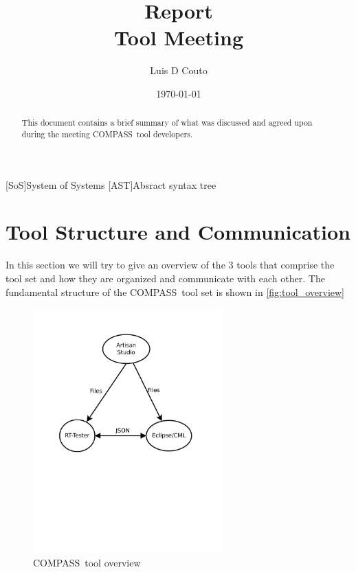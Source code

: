 \documentclass[a4paper,12pt,english]{article}
\title{Report \\ Tool Meeting}
\date{\today}
\author{Luis D Couto}
\def\compass{COMPASS}
\begin{document}
[SoS]{System of Systems}
[AST]{Absract syntax tree}

\maketitle
\listoffixmes

\begin{abstract}
This document contains a brief summary of what was discussed and agreed upon during the meeting \compass\ tool developers.

\end{abstract}






\section{Tool Structure and Communication}

	In this section we will try to give an overview of the 3 tools that comprise the tool set and how they are organized and communicate with each other.
	The fundamental structure of the \compass\ tool set is shown in \autoref{fig:tool_overview} 

\begin{figure}[htbp]
	\centering
		\includegraphics[width=0.65\textwidth]{tool_overview}
	\caption{\compass\ tool overview}
	\label{fig:tool_overview}
\end{figure}
\end{document}
